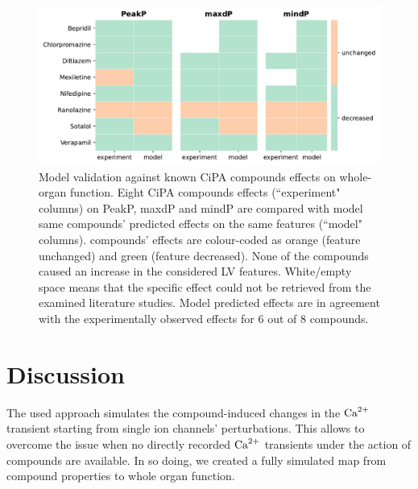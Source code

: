 \begin{figure}[ht!]
    \myfloatalign
    \includegraphics[width=\textwidth]{figures/chapter06/model_vs_experiments.pdf}
    \caption{Model validation against known CiPA compounds effects on whole-organ function. Eight CiPA compounds effects (``experiment" columns) on PeakP, maxdP and mindP are compared with model same compounds' predicted effects on the same features (``model" columns). compounds' effects are colour-coded as orange (feature unchanged) and green (feature decreased). None of the compounds caused an increase in the considered LV features. White/empty space means that the specific effect could not be retrieved from the examined literature studies. Model predicted effects are in agreement with the experimentally observed effects for $6$ out of $8$ compounds.}
    \label{fig:validationtable}
\end{figure}


%
%
%
\section{Discussion}\label{sec:ch6discussion}
The used approach simulates the compound-induced changes in the $\textrm{Ca}^{2+}$ transient starting from single ion channels' perturbations. This allows to overcome the issue when no directly recorded $\textrm{Ca}^{2+}$ transients under the action of compounds are available. In so doing, we created a fully simulated map from compound properties to whole organ function.


%
%
%
